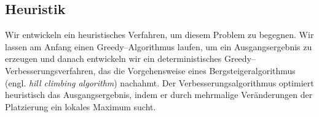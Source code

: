 \subsection{Heuristik}
Wir entwickeln ein heuristisches Verfahren, um diesem Problem zu begegnen. 
Wir lassen am Anfang einen Greedy--Algorithmus laufen, um ein Ausgangsergebnis zu erzeugen und
danach entwickeln wir ein deterministisches Greedy--Verbesserungsverfahren, das die Vorgehensweise
eines Bergsteigeralgorithmus (engl. \textit{hill climbing algorithm}) nachahmt. 
Der Verbesserungsalgorithmus optimiert heuristisch das Ausgangsergebnis, 
indem er durch mehrmalige Veränderungen der Platzierung ein lokales Maximum sucht.





